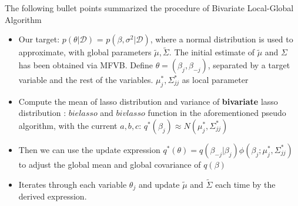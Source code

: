 The following bullet points summarized the procedure of Bivariate Local-Global Algorithm
\begin{itemize}
	\item Our target: $p(\theta|\mathcal{D})$ = $p(\beta, \sigma^2|\mathcal{D})$, where a normal distribution is used to approximate, with global parameters $\tilde{\mu},\tilde{\Sigma}$. The initial estimate of $\tilde{\mu}$ and $\Sigma$ has been obtained via MFVB. Define $\theta = (\beta_j,\beta_{-j})$, separated by a target variable and the rest of the variables. $\mu_{j}^*, \Sigma_{jj}^*$ as local parameter
	\item Compute the mean of lasso distribution and variance of \textbf{bivariate} lasso distribution : $bielasso$ and $bivlasso$ function in the aforementioned pseudo algorithm, with the current $a,b,c$: $q^*(\beta_j) \approx N(\mu_j^*,\Sigma_{jj}^*)$
	\item Then we can use the update expression $q^*(\theta) = q(\beta_{-j}|\beta_j)\phi(\beta_j;\mu_j^*,\Sigma_{jj}^*)$ to adjust the global mean and global covariance of $q(\beta)$
	\item Iterates through each variable $\theta_j$ and update $\tilde{\mu}$ and $\tilde{\Sigma}$ each time by the derived expression.
\end{itemize}